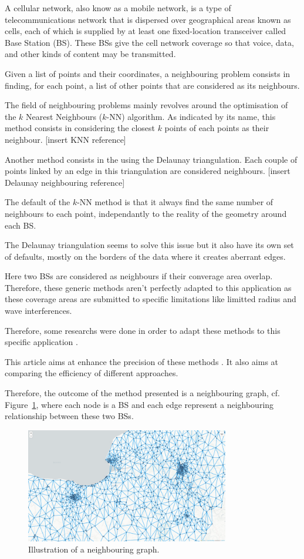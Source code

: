 \documentclass[lettersize,journal,english]{IEEEtran}
\begin{document}
    A cellular network, also know as a mobile network, is a type of telecommunications network that is dispersed over geographical areas known as cells, each of which is supplied by at least one fixed-location transceiver called Base Station (BS). These BSs give the cell network coverage so that voice, data, and other kinds of content may be transmitted.
    
    Given a list of points and their coordinates, a neighbouring problem consists in finding, for each point, a list of other points that are considered as its neighbours.

    The field of neighbouring problems mainly revolves around the optimisation of the $k$ Nearest Neighbours ($k$-NN) algorithm.
    As indicated by its name, this method consists in considering the closest $k$ points of each points as their neighbour.
    [insert KNN reference]

    Another method consists in the using the Delaunay triangulation. Each couple of points linked by an edge in this triangulation are considered neighbours.
    [insert Delaunay neighbouring reference]

    The default of the $k$-NN method is that it always find the same number of neighbours to each point, independantly to the reality of the geometry around each BS.
    
    The Delaunay triangulation seems to solve this issue but it also have its own set of defaults, mostly on the borders of the data where it creates aberrant edges.

    Here two BSs are considered as neighbours if their converage area overlap. Therefore, these generic methods aren't perfectly adapted to this application as these coverage areas are submitted to specific limitations like limitted radius and wave interferences.

    Therefore, some researchs were done in order to adapt these methods to this specific application \cite{patent_neighs}.

    This article aims at enhance the precision of these methods . It also aims at comparing the efficiency of different approaches. 

    Therefore, the outcome of the method presented is a neighbouring graph, cf. Figure~\ref{fig:neigh_graph}, where each node is a BS and each edge represent a neighbouring relationship between these two BSs.
    \begin{figure}
        \centering
        \includegraphics[width=3.5in]{images/illus_graphs/neighbouring_graph.png}
        \caption{Illustration of a neighbouring graph.}
        \label{fig:neigh_graph}
    \end{figure}
\end{document}
